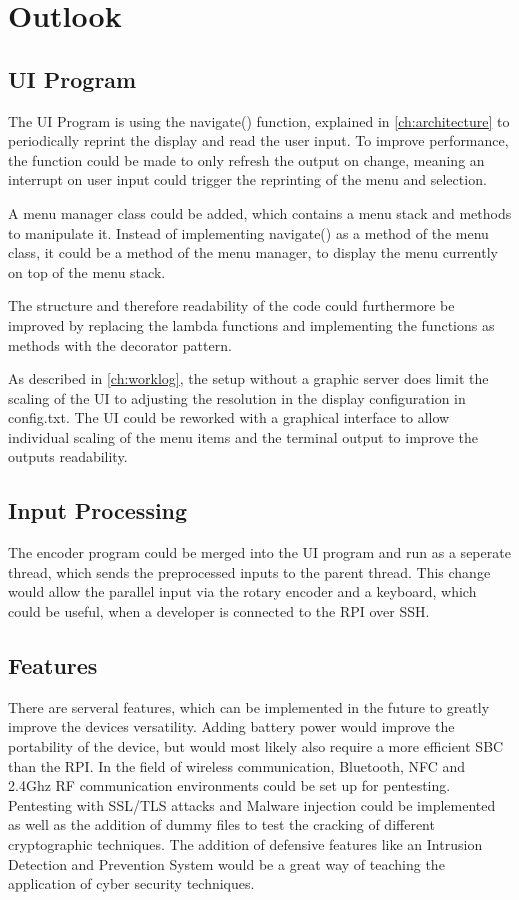 \chapter{Outlook}\label{ch:outlook}
\section{UI Program}
The UI Program is using the navigate() function, explained in \cref{ch:architecture} to periodically reprint the display and read the user input.
To improve performance, the function could be made to only refresh the output on change, meaning an interrupt on user input could trigger the reprinting of the menu and selection.

A menu manager class could be added, which contains a menu stack and methods to manipulate it.
Instead of implementing navigate() as a method of the menu class, it could be a method of the menu manager, to display the menu currently on top of the menu stack.

The structure and therefore readability of the code could furthermore be improved by replacing the lambda functions and implementing the functions as methods with the decorator pattern.

As described in \cref{ch:worklog}, the setup without a graphic server does limit the scaling of the UI to adjusting the resolution in the display configuration in config.txt.
The UI could be reworked with a graphical interface to allow individual scaling of the menu items and the terminal output to improve the outputs readability.


\section{Input Processing}
The encoder program could be merged into the UI program and run as a seperate thread, which sends the preprocessed inputs to the parent thread.
This change would allow the parallel input via the rotary encoder and a keyboard, which could be useful, when a developer is connected to the RPI over SSH.

\section{Features}
There are serveral features, which can be implemented in the future to greatly improve the devices versatility.
Adding battery power would improve the portability of the device, but would most likely also require a more efficient SBC than the RPI.
In the field of wireless communication, Bluetooth, NFC and 2.4Ghz RF communication environments could be set up for pentesting.
Pentesting with SSL/TLS attacks and Malware injection could be implemented as well as the addition of dummy files to test the cracking of different cryptographic techniques.
The addition of defensive features like an Intrusion Detection and Prevention System would be a great way of teaching the application of cyber security techniques. 
